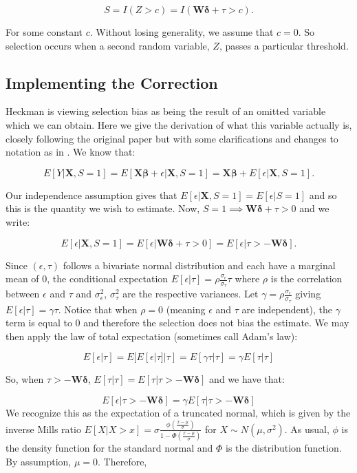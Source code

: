 \documentclass[12pt,twoside]{reedthesis}
\theoremstyle{definition}
\begin{document}
$$S = I(Z > c) = I( \mathbf{W} \boldsymbol{\delta} + \tau > c).$$ 

For some constant $c$. Without losing generality, we assume that $c = 0$. So selection occurs when a second random variable, $Z$,  passes a particular threshold. 

\subsection{Implementing the Correction}

Heckman is viewing selection bias as being the result of an omitted variable which we can obtain. Here we give the derivation of what this variable actually is, closely following the original paper but with some clarifications and changes to notation as in \citep{Jin}. We know that:

$$E[Y | \mathbf{X}, S = 1] = E[ \mathbf{X} \boldsymbol{\beta} + \epsilon | \mathbf{X}, S = 1] = \mathbf{X} \boldsymbol{\beta} + E[\epsilon |  \mathbf{X}, S = 1].$$

Our independence assumption gives that $ E[\epsilon |  \mathbf{X}, S = 1] =  E[\epsilon |  S = 1]$ and so this is the quantity we wish to estimate. Now, $S=1 \implies  \mathbf{W} \boldsymbol{\delta} + \tau > 0$ and we write:  

$$E[\epsilon |  \mathbf{X}, S = 1] = E[\epsilon | \mathbf{W} \boldsymbol{\delta}+ \tau > 0] = E[\epsilon |  \tau > - \mathbf{W} \boldsymbol{\delta}].$$

Since $(\epsilon, \tau)$ follows a bivariate normal distribution and each have a marginal mean of $0$, the conditional expectation $E[\epsilon | \tau] = \rho \frac{\sigma_{\epsilon}}{\sigma_{\tau}} \tau$ where $\rho$ is the correlation between $\epsilon$ and $\tau$ and $\sigma^2_{\epsilon}$, $\sigma^2_{\tau}$ are the respective variances. Let $\gamma  = \rho \frac{\sigma_{\epsilon}}{\sigma_{\tau}}$ giving $E[\epsilon | \tau] = \gamma \tau$. Notice that when $\rho = 0$ (meaning $\epsilon$ and $\tau$ are independent), the $\gamma$ term is equal to $0$ and therefore the selection does not bias the estimate.  We may then apply the law of total expectation (sometimes call Adam's law):

$$E[\epsilon | \tau] = E[E[\epsilon | \tau] | \tau] = E[\gamma \tau | \tau] = \gamma E[\tau | \tau]$$	

So, when $\tau > - \mathbf{W} \boldsymbol{\delta}$, $E[\tau | \tau] = E[\tau | \tau > - \mathbf{W} \boldsymbol{\delta}]$ and we have that:

$$E[\epsilon | \tau >  - \mathbf{W} \boldsymbol{\delta}]  = \gamma E[ \tau | \tau >   - \mathbf{W} \boldsymbol{\delta}]$$																																																												
We recognize this as the expectation of a truncated normal, which is given by the inverse Mills ratio $E[X | X > x] = \sigma \frac{\phi(\frac{x- \mu}{\sigma})}{1 - \Phi(\frac{x - \mu}{\sigma})}$ for $X \sim N(\mu, \sigma^2)$. As usual, $\phi$ is the density function for the standard normal and $\Phi$ is the distribution function. By assumption, $\mu = 0$. Therefore,						
\end{document}
